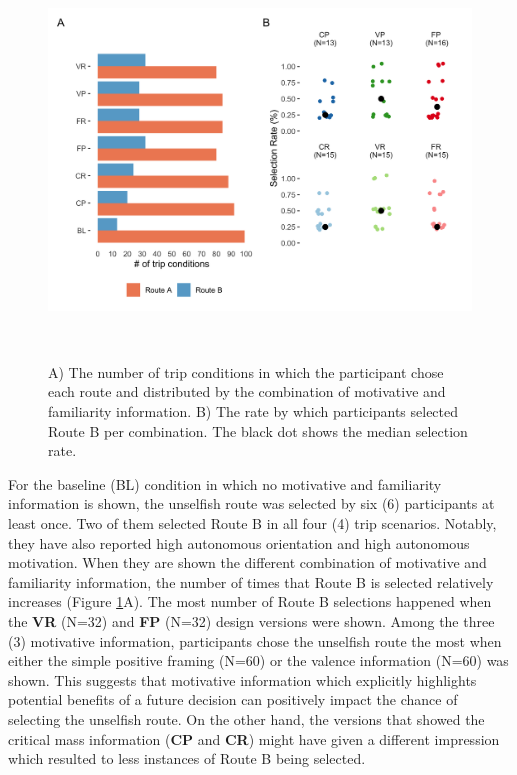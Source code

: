 \begin{figure}[h]
\centering
  \includegraphics[scale=.2]{figures/s3-rc-unselfishratebycond.png}
  \caption{A) The number of trip conditions in which the participant chose each route and distributed by the combination of motivative and familiarity information. B) The rate by which participants selected Route B per combination. The black dot shows the median selection rate.}~\label{fig:s3-rc-unselfishratebycond}
\end{figure}

For the baseline (BL) condition in which no motivative and familiarity information is shown, the unselfish route was selected by six (6) participants at least once. Two of them selected Route B in all four (4) trip scenarios. Notably, they have also reported high autonomous orientation and high autonomous motivation. When they are shown the different combination of motivative and familiarity information, the number of times that Route B is selected relatively increases (Figure \ref{fig:s3-rc-unselfishratebycond}A). The most number of Route B selections happened when the \textbf{VR} (N=32) and \textbf{FP} (N=32) design versions were shown. Among the three (3) motivative information, participants chose the unselfish route the most when either the simple positive framing (N=60) or the valence information (N=60) was shown. This suggests that motivative information which explicitly highlights potential benefits of a future decision can positively impact the chance of selecting the unselfish route. On the other hand, the versions that showed the critical mass information (\textbf{CP} and \textbf{CR}) might have given a different impression which resulted to less instances of Route B being selected. 

